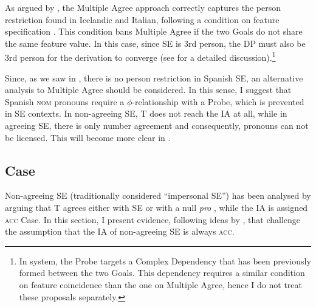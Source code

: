 \documentclass[output=paper,colorlinks,citecolor=brown]{langscibook}
\begin{document}
As argued by \citet{DAlessandro2007}, the Multiple Agree approach correctly captures the person restriction found in Icelandic and Italian, following a condition on feature specification \citep{Anagnos2005}. This condition bans Multiple Agree if the two Goals do not share the same feature value. In this case, since SE is 3rd person, the DP must also be 3rd person for the derivation to converge (see \citealt[§3]{DAlessandro2007} for a detailed discussion).\footnote{In  system, the Probe targets a Complex Dependency that has been previously formed between the two Goals. This dependency requires a similar condition on feature coincidence than the one on Multiple Agree, hence I do not treat these proposals separately.}

Since, as we saw in , there is no person restriction in Spanish SE, an alternative analysis to Multiple Agree should be considered. In this sense, I suggest that Spanish \textsc{nom} pronouns require a $\phi$-relationship with a Probe, which is prevented in SE contexts. In non-agreeing SE, T does not reach the IA at all, while in agreeing SE, there is only number agreement and consequently, pronouns can not  be licensed. This will become more clear in .


\subsection{Case}

Non-agreeing SE (traditionally considered ``impersonal SE'') has been analysed by arguing that T agrees either with SE \citep{RaposoUriag1996, Lopez2007, PujalteSaab2014, OrmazabalRomero2019} or with a null \textit{pro} \citep{Otero1986, Cinque1988d, Bosque&Reixach2009, Torrego2008}, while the IA is assigned \textsc{acc} Case. In this section, I present evidence, following ideas by \citet{OrdonezTrevino2016}, that challenge the assumption that the IA of non-agreeing SE is always \textsc{acc}.
\end{document}
